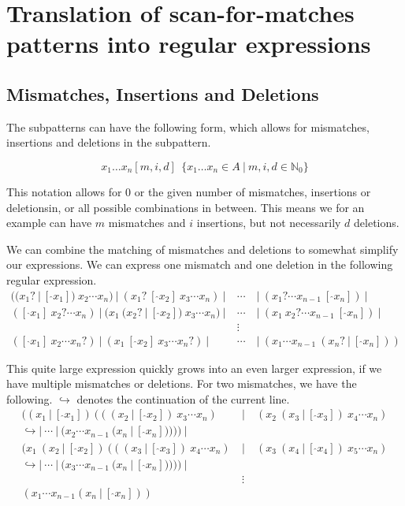 \documentclass[12pt]{article}
\begin{document}
\newpage

\section{Translation of scan-for-matches patterns into regular expressions}

\subsection{Mismatches, Insertions and Deletions}

The subpatterns can have the following form, which allows for mismatches, insertions and deletions in the subpattern. 

\begin{equation}
	x_1 \ldots x_n[m, i, d] \ \ \{ x_1 \ldots x_n \in A \ | \ m, i, d \in \mathbb{N}_0 \}
\end{equation} 

This notation allows for 0 or the given number of mismatches, insertions or deletionsin, or all possible combinations in between. This means we for an example can have $m$ mismatches and $i$ insertions, but not necessarily $d$ deletions.

We can combine the matching of mismatches and deletions to somewhat simplify our expressions.
We can express one mismatch and one deletion in the following regular expression.
\begin{eqnarray}
	((x_1?\ |\ [\ \hat{}x_1]) \ x_2 \cdots x_n) \ | \ (x_1? \ [\ \hat{}x_2] \ x_3 \cdots x_n) \ | \ & \cdots & \ | \ (x_1? \cdots x_{n-1} \ [\ \hat{}x_n]) \ | \\
	([\ \hat{}x_1] \ x_2? \cdots x_n) \ | \ (x_1 \ (x_2?\ |\ [\ \hat{}x_2]) \ x_3 \cdots x_n) \ | \ & \cdots & \ | \ (x_1 \ x_2? \cdots x_{n-1} \ [\ \hat{}x_n]) \ | \nonumber \\
	& \vdots & \nonumber \\
	([\ \hat{}x_1] \ x_2 \cdots x_n?) \ | \ (x_1 \ [\ \hat{}x_2] \ x_3 \cdots x_n?) \ | \ & \cdots & \ | \ (x_1 \cdots x_{n-1} \ (x_n?\ |\ [\ \hat{}x_n])) \nonumber
\end{eqnarray}

This quite large expression quickly grows into an even larger expression, if we have multiple mismatches or deletions. For two mismatches, we have the following. $\hookrightarrow$ denotes the continuation of the current line.
\begin{eqnarray}
	((x_1\ |\ [\ \hat{}x_1])\ (((x_2\ |\ [\ \hat{}x_2])\ x_3 \cdots x_n)\ &|&\ (x_2\ (x_3\ |\ [\ \hat{}x_3])\ x_4 \cdots x_n)\\
	\hookrightarrow |\ \cdots\ |\ (x_2\cdots x_{n-1}\ (x_n\ |\ [\ \hat{}x_n]))))\ | \nonumber \\
	 (x_1\ (x_2\ |\ [\ \hat{}x_2])\ (((x_3\ |\ [\ \hat{}x_3])\ x_4 \cdots x_n)\ &|&\ (x_3\ (x_4\ |\ [\ \hat{}x_4])\ x_5 \cdots x_n) \nonumber \\
	 \hookrightarrow |\ \cdots\ |\ (x_3 \cdots x_{n-1}\ (x_n\ |\ [\ \hat{}x_n]))))\ | \nonumber \\
	 & \vdots & \nonumber \\
	 (x_1\cdots x_{n-1}(x_n\ |\ [\ \hat{}x_n])) \nonumber
\end{eqnarray}
\end{document}
